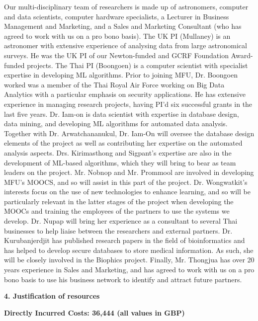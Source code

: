 \documentclass[11pt]{article}
\begin{document}
  \noindent
  Our multi-disciplinary team of researchers is made up of astronomers, computer and data scientists, computer hardware specialists, a Lecturer in Business Management and Marketing, and a Sales and Marketing Consultant (who has agreed to work with us on a pro bono basis). The UK PI (Mullaney) is an astronomer with extensive experience of analysing data from large astronomical surveys. He was the UK PI of our Newton-funded and GCRF Foundation Award-funded projects. The Thai PI (Boongoen) is a computer scientist with specialist expertise in developing ML algorithms. Prior to joining MFU, Dr. Boongoen worked was a member of the Thai Royal Air Force working on Big Data Analytics with a particular emphasis on security applications. He has extensive experience in managing research projects, having PI'd six successful grants in the last five years. Dr. Iam-on is data scientist with expertise in database design, data mining, and developing ML algorithms for automated data analysis. Together with Dr. Arwatchananukul, Dr. Iam-On will oversee the database design elements of the project as well as contributing her expertise on the automated analysis aspects. Drs. Kirimasthong and Sigpant's expertise are also in the development of ML-based algorithms, which they will bring to bear as team leaders on the project. Mr. Nobnop and Mr. Prommool are involved in developing MFU's MOOCS, and so will assist in this part of the project. Dr. Wongwatkit's interests focus on the use of new technologies to enhance learning, and so will be particularly relevant in the latter stages of the project when developing the MOOCs and training the employees of the partners to use the systems we develop. Dr. Nupap will bring her experience as a consultant to several Thai businesses to help liaise between the researchers and external partners. Dr. Kurubanjerdjit has published research papers in the field of bioinformatics and has helped to develop secure databases to store medical information. As such, she will be closely involved in the Biophics project. Finally, Mr. Thongjua has over 20 years experience in Sales and Marketing, and has agreed to work with us on a pro bono basis to use his business network to identify and attract future partners.
  
  \pagebreak

  \noindent
  {\large \bf 4. Justification of resources }

  \vspace{3mm}
  \noindent
  {\bf Directly Incurred Costs: 36,444 (all values in GBP)}
  
\end{document}
